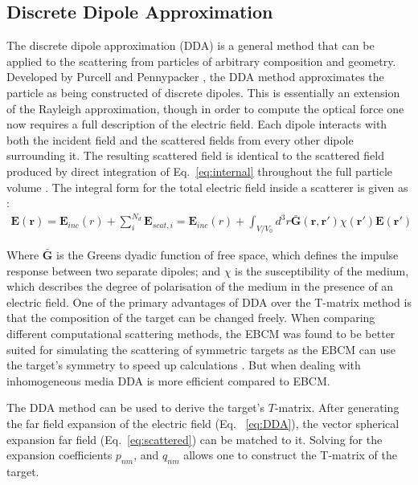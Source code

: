 \subsection{Discrete Dipole Approximation}
The discrete dipole approximation (DDA) is a general method that 
can be applied to the scattering from particles of arbitrary 
composition and geometry. Developed by Purcell and Pennypacker 
\cite{Purcell1973}, the DDA method approximates the particle as 
being constructed of discrete dipoles. This is essentially an 
extension of the Rayleigh approximation, though in order to compute 
the optical force one now requires a full description of the electric 
field. Each dipole interacts with both the incident field and the 
scattered fields from every other dipole surrounding it. The 
resulting scattered field is identical to the scattered field 
produced by direct integration of Eq.~\eqref{eq:internal} 
throughout the full particle volume \cite{Goedecke1988}. The 
integral form for the total electric field inside a scatterer is 
given as \cite{Wriedt1998}:
\begin{align}
	\mathbf{E(r)} = \mathbf{E}_{inc}(r) + \sum^{N_d}_{i}\mathbf{E}_{scat,i} =  
	\mathbf{E}_{inc}(r) + \int_{V/V_0}d^3r\mathbf{\bar{G}(r,r')}
	\chi(\mathbf{r'})\mathbf{E(r')}
	\label{eq:DDA}
\end{align}

Where $\mathbf{\bar{G}}$ is the Greens dyadic function of free space, 
which defines the impulse response between two separate dipoles; and 
$\chi$ is the susceptibility of the medium, which describes the 
degree of polarisation of the medium in the presence of an electric 
field. One of the primary advantages of DDA over the T-matrix method 
is that the composition of the target can be changed freely. When 
comparing different computational scattering methods, the EBCM was 
found to be better suited for simulating the scattering of symmetric
targets as the EBCM can use the target's symmetry to speed up 
calculations \cite{Wriedt1998}. But when dealing with inhomogeneous 
media DDA is more efficient compared to EBCM. 

The DDA method can be used to derive the target's $T$-matrix. After
generating the far field expansion of the electric field (Eq.~
\eqref{eq:DDA}), the vector spherical expansion far field 
(Eq.~\eqref{eq:scattered}) can be matched to it. Solving for the 
expansion coefficients $p_{nm}$, and $q_{nm}$ allows one to construct
the T-matrix of the target. 
\newpage

